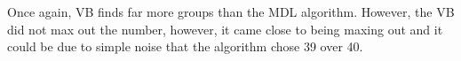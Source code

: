 
Once again, VB finds far more groups than the MDL algorithm. However, the VB
did not max out the number, however, it came close to being maxing out and
it could be due to simple noise that the algorithm chose 39 over 40.
